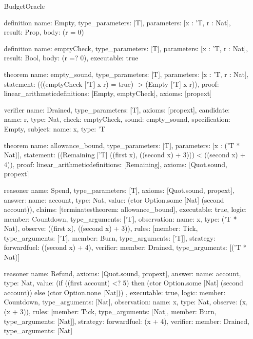 \begin{lexlean}{BudgetOracle}
\begin{semanticmodule}
definition{
  name: Empty,
  type_parameters: [T],
  parameters: [x : 'T, r : Nat],
  result: Prop,
  body: (r = 0)
}

definition{
  name: emptyCheck,
  type_parameters: [T],
  parameters: [x : 'T, r : Nat],
  result: Bool,
  body: (r =? 0),
  executable: true
}

theorem{
  name: empty_sound,
  type_parameters: [T],
  parameters: [x : 'T, r : Nat],
  statement: (((emptyCheck ['T] x r) = true) -> (Empty ['T] x r)),
  proof: linear_arithmetic{definitions: [Empty, emptyCheck]},
  axioms: [propext]
}

verifier{
  name: Drained,
  type_parameters: [T],
  axioms: [propext],
  candidate: {name: r, type: Nat},
  check: emptyCheck,
  sound: empty_sound,
  specification: Empty,
  subject: {name: x, type: 'T}
}

theorem{
  name: allowance_bound,
  type_parameters: [T],
  parameters: [x : ('T * Nat)],
  statement: ((Remaining ['T] ((first x), ((second x) + 3))) < ((second x) + 4)),
  proof: linear_arithmetic{definitions: [Remaining]},
  axioms: [Quot.sound, propext]
}

reasoner{
  name: Spend,
  type_parameters: [T],
  axioms: [Quot.sound, propext],
  answer: {name: account, type: Nat, value: (ctor Option.some [Nat] (second account))},
  claims: [terminates{theorem: allowance_bound}],
  executable: true,
  logic: {member: Countdown, type_arguments: ['T]},
  observation: {name: x, type: ('T * Nat)},
  observe: ((first x), ((second x) + 3)),
  rules: [{member: Tick, type_arguments: ['T]}, {member: Burn, type_arguments: ['T]}],
  strategy: forward{fuel: ((second x) + 4)},
  verifier: {member: Drained, type_arguments: [('T * Nat)]}
}

reasoner{
  name: Refund,
  axioms: [Quot.sound, propext],
  answer: {
    name: account,
    type: Nat,
    value: (if ((first account) <? 5) then (ctor Option.some [Nat] (second account)) else (ctor Option.none [Nat]))
  },
  executable: true,
  logic: {member: Countdown, type_arguments: [Nat]},
  observation: {name: x, type: Nat},
  observe: (x, (x + 3)),
  rules: [{member: Tick, type_arguments: [Nat]}, {member: Burn, type_arguments: [Nat]}],
  strategy: forward{fuel: (x + 4)},
  verifier: {member: Drained, type_arguments: [Nat]}
}
\end{semanticmodule}
\end{lexlean}
